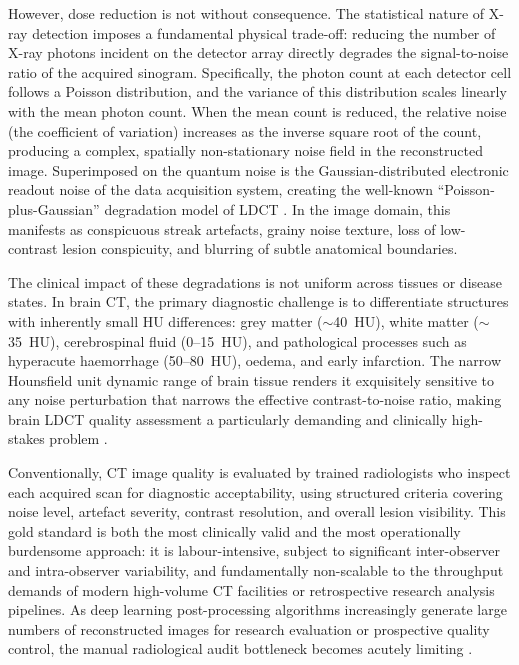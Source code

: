 However, dose reduction is not without consequence. The statistical nature of X-ray
detection imposes a fundamental physical trade-off: reducing the number of X-ray photons
incident on the detector array directly degrades the signal-to-noise ratio of the acquired
sinogram. Specifically, the photon count at each detector cell follows a Poisson
distribution, and the variance of this distribution scales linearly with the mean photon
count. When the mean count is reduced, the relative noise (the coefficient of variation)
increases as the inverse square root of the count, producing a complex, spatially
non-stationary noise field in the reconstructed image. Superimposed on the quantum noise
is the Gaussian-distributed electronic readout noise of the data acquisition system,
creating the well-known ``Poisson-plus-Gaussian'' degradation model of LDCT \cite{zhang2024review}.
In the image domain, this manifests as conspicuous streak artefacts, grainy noise texture,
loss of low-contrast lesion conspicuity, and blurring of subtle anatomical boundaries.

The clinical impact of these degradations is not uniform across tissues or disease states.
In brain CT, the primary diagnostic challenge is to differentiate structures with inherently
small HU differences: grey matter ($\sim$40~HU), white matter ($\sim$35~HU), cerebrospinal
fluid (0--15~HU), and pathological processes such as hyperacute haemorrhage (50--80~HU),
oedema, and early infarction. The narrow Hounsfield unit dynamic range of brain tissue
renders it exquisitely sensitive to any noise perturbation that narrows the effective
contrast-to-noise ratio, making brain LDCT quality assessment a particularly demanding
and clinically high-stakes problem \cite{brainCT_window}.

Conventionally, CT image quality is evaluated by trained radiologists who inspect each
acquired scan for diagnostic acceptability, using structured criteria covering noise
level, artefact severity, contrast resolution, and overall lesion visibility. This gold
standard is both the most clinically valid and the most operationally burdensome approach:
it is labour-intensive, subject to significant inter-observer and intra-observer
variability, and fundamentally non-scalable to the throughput demands of modern
high-volume CT facilities or retrospective research analysis pipelines. As deep learning
post-processing algorithms increasingly generate large numbers of reconstructed images
for research evaluation or prospective quality control, the manual radiological audit
bottleneck becomes acutely limiting \cite{herath2025}.

